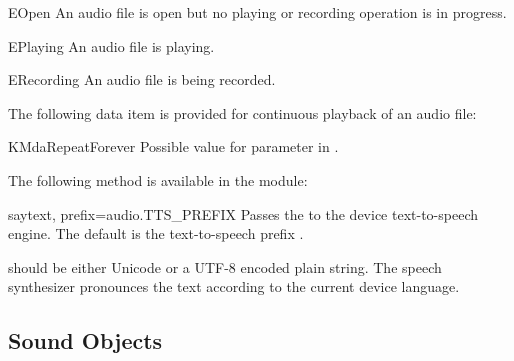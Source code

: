 \begin{datadesc}{EOpen} 
An audio file is open but no playing or recording operation is in progress.
\end{datadesc}

\begin{datadesc}{EPlaying} 
An audio file is playing.
\end{datadesc}

\begin{datadesc}{ERecording}
An audio file is being recorded.
\end{datadesc}

The following data item is provided for continuous playback of an audio file:

\begin{datadesc}{KMdaRepeatForever}
Possible value for  parameter in .
\end{datadesc}

The following method is available in the  module:

\begin{funcdesc}{say}{text, prefix=audio.TTS_PREFIX}
Passes the  to the device text-to-speech engine. The default 
 is the text-to-speech prefix . 

 should be either Unicode or a UTF-8 encoded plain
string. The speech synthesizer pronounces the text according to the
current device language.
\end{funcdesc}

\subsection{Sound Objects}
\label{subsec:sound}

